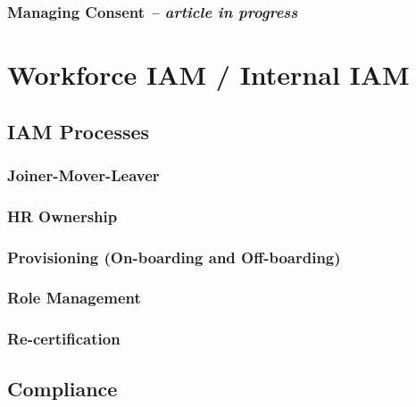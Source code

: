 \hypertarget{managing-consent-article-in-progress}{%
\subsection{\texorpdfstring{Managing Consent \emph{-- article in
progress}}{Managing Consent -- article in progress}}\label{managing-consent-article-in-progress}}

\hypertarget{workforce-iam-internal-iam}{%
\chapter{Workforce IAM / Internal
IAM}\label{workforce-iam-internal-iam}}

\hypertarget{iam-processes}{%
\section{IAM Processes}\label{iam-processes}}

\hypertarget{joiner-mover-leaver}{%
\subsection{Joiner-Mover-Leaver}\label{joiner-mover-leaver}}

\hypertarget{hr-ownership}{%
\subsection{HR Ownership}\label{hr-ownership}}

\hypertarget{provisioning-on-boarding-and-off-boarding}{%
\subsection{Provisioning (On-boarding and
Off-boarding)}\label{provisioning-on-boarding-and-off-boarding}}

\hypertarget{role-management}{%
\subsection{Role Management}\label{role-management}}

\hypertarget{re-certification}{%
\subsection{Re-certification}\label{re-certification}}

\hypertarget{compliance}{%
\section{Compliance}\label{compliance}}

